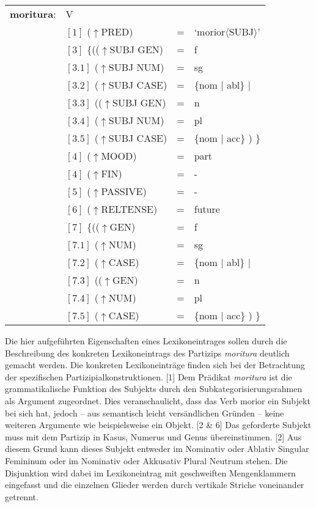 \documentclass[12pt,a4paper]{article}
\begin{document}
\begin{singlespace}
\begin{tabular}{ l  l  l  l  } 
\textbf{moritura}: & V \\
$\qquad$ & $[1]$ \:  ($\uparrow$PRED) & = & `morior$\langle$SUBJ$\rangle$'\\
$\qquad$ & $[3]$ \:  \{(($\uparrow$SUBJ GEN) & = & f \\ 
$\qquad$ & $[3.1]$ \:  ($\uparrow$SUBJ NUM) & = & sg \\
$\qquad$ & $[3.2]$ \:  ($\uparrow$SUBJ CASE) & = & \{nom $\mid$ abl\} $\mid$\\
$\qquad$ & $[3.3]$ \: (($\uparrow$SUBJ GEN) & = & n \\
$\qquad$ & $[3.4]$ \:  ($\uparrow$SUBJ NUM) & = & pl \\
$\qquad$ & $[3.5]$ \:  ($\uparrow$SUBJ CASE) & = & \{nom $\mid$ acc\} ) \}\\
$\qquad$ & $[4]$ \:  ($\uparrow$MOOD) & = & part\\
$\qquad$ & $[4]$ \:  ($\uparrow$FIN) & = & - \\
$\qquad$ & $[5]$ \:  ($\uparrow$PASSIVE) & = & - \\
$\qquad$ & $[6]$ \:  ($\uparrow$RELTENSE) & = & future \\
$\qquad$ & $[7]$ \:  \{(($\uparrow$GEN) & = & f \\ 
$\qquad$ & $[7.1]$ \:  ($\uparrow$NUM) & = & sg \\
$\qquad$ & $[7.2]$ \:  ($\uparrow$CASE) & = & \{nom $\mid$ abl\} $\mid$\\
$\qquad$ & $[7.3]$ \: (($\uparrow$GEN) & = & n \\
$\qquad$ & $[7.4]$ \:  ($\uparrow$NUM) & = & pl \\
$\qquad$ & $[7.5]$ \:  ($\uparrow$CASE) & = & \{nom $\mid$ acc\} ) \}\\
\end{tabular}
\newline
\newline
\end{singlespace}

Die hier aufgeführten Eigenschaften eines Lexikoneintrages sollen durch die Beschreibung des konkreten Lexikoneintrags des Partizips \textit{moritura} deutlich gemacht werden. Die konkreten Lexikoneinträge finden sich bei der Betrachtung der spezifischen Partizipialkonstruktionen. [1] Dem Prädikat \textit{moritura} ist die grammatikalische Funktion des Subjekts durch den Subkategorisierungsrahmen als Argument zugeordnet. Dies veranschaulicht, dass das Verb morior ein Subjekt bei sich hat, jedoch -- aus semantisch leicht versändlichen Gründen -- keine weiteren Argumente wie beispielsweise ein Objekt.
[2 \& 6] Das geforderte Subjekt muss mit dem Partizip in Kasus, Numerus und Genus übereinstimmen. [2] Aus diesem Grund kann dieses Subjekt entweder im Nominativ oder Ablativ Singular Femininum oder im Nominativ oder Akkusativ Plural Neutrum stehen. Die Disjunktion wird dabei im Lexikoneintrag mit geschweiften Mengenklammern eingefasst und die einzelnen Glieder werden durch vertikale Striche voneinander getrennt.
\end{document}
